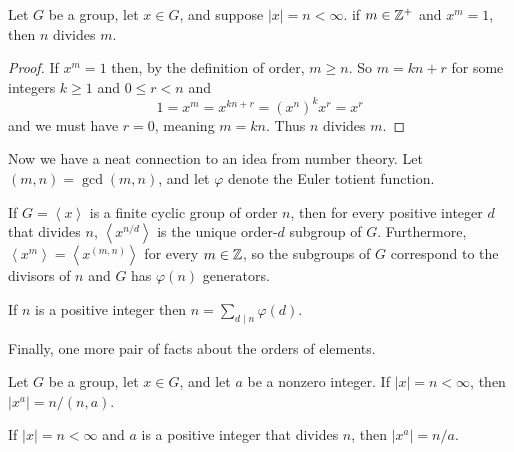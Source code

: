 \documentclass[../m171main.tex]{subfiles}
\begin{document}
\begin{theorem}[]
    Let $G$ be a group, let $x \in G$, and suppose $|x| = n < \infty$.
    if $m \in \mathbb{Z}^+$ and $x^{m} = 1$, then $n$ divides $m$.
\end{theorem}

\begin{proof}
    If $x^{m} = 1$ then, by the definition of order, $m \geq n$.
    So $m = kn + r$ for some integers $k \geq 1$ and $0 \leq r < n$ and \vspace{-6pt}
    \[ 1 = x^{m} = x^{kn + r} = \left( x^{n} \right)^{k} x^{r} = x^{r} \]
    and we must have $r = 0$, meaning $m = kn$.
    Thus $n$ divides $m$.
\end{proof}

Now we have a neat connection to an idea from number theory.
Let $(m,n) = \gcd(m,n)$, and let $\varphi$ denote the Euler totient function.

\begin{theorem}[]
    If $G = \left< x \right>$ is a finite cyclic group of order $n$, then for every positive integer $d$ that divides $n$, $\left< x^{n / d} \right>$ is the unique order-$d$ subgroup of $G$.
    Furthermore, $\left< x^{m} \right> = \left< x^{(m,n)} \right>$ for every $m \in \mathbb{Z}$, so the subgroups of $G$ correspond to the divisors of $n$ and $G$ has $\varphi(n)$ generators.
\end{theorem}

\begin{corollary}[]
    If $n$ is a positive integer then $n = \sum_{d \mid n} \varphi(d)$.
\end{corollary}

Finally, one more pair of facts about the orders of elements.

\begin{theorem}[]
    Let $G$ be a group, let $x \in G$, and let $a$ be a nonzero integer.
    If $|x| = n < \infty$, then $|x^{a}| = n / (n,a)$.
\end{theorem}

\begin{corollary}[]
    If $|x| = n < \infty$ and $a$ is a positive integer that divides $n$, then $|x^{a}| = n / a$.
\end{corollary}
\end{document}
